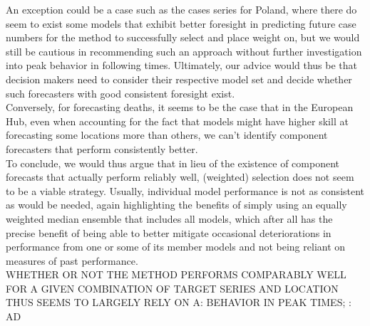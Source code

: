 An exception could be a case such as the cases series for Poland, where there do seem to exist some models that exhibit better foresight in predicting future case numbers for the method to successfully select and place weight on, but we would still be cautious in recommending such an approach without further investigation into peak behavior in following times. Ultimately, our advice would thus be that decision makers need to consider their respective model set and decide whether such forecasters with good consistent foresight exist.\\ 
Conversely, for forecasting deaths, it seems to be the case that in the European Hub, even when accounting for the fact that models might have higher skill at forecasting some locations more than others, we can't identify component forecasters that perform consistently better.\medskip\\ 
To conclude, we would thus argue that in lieu of the existence of component forecasts that actually perform reliably well, (weighted) selection does not seem to be a viable strategy. Usually, individual model performance is not as consistent as would be needed, again highlighting the benefits of simply using an equally weighted median ensemble that includes all models, which after all has the precise benefit of being able to better mitigate occasional deteriorations in performance from one or some of its member models and not being reliant on measures of past performance.\\
WHETHER OR NOT THE METHOD PERFORMS COMPARABLY WELL FOR A GIVEN COMBINATION OF TARGET SERIES AND LOCATION THUS SEEMS TO LARGELY RELY ON A: BEHAVIOR IN PEAK TIMES; : AD 
